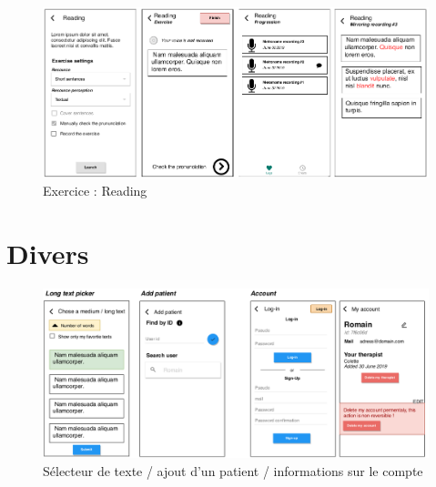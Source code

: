 \begin{appendices}
\begin{figure}[H]
  \includegraphics[width=1\linewidth]{content/imgs/maquette2d.png}
  \caption*{Exercice : Reading}
\end{figure}

\section{Divers}
\begin{figure}[H]
  \includegraphics[width=1\linewidth]{content/imgs/maquette3.png}
  \caption*{Sélecteur de texte / ajout d'un patient / informations sur le compte}
\end{figure}






\begin{landscape}

\end{landscape}
\end{appendices}
